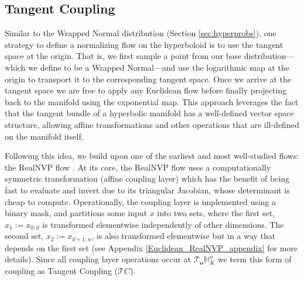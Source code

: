\subsection{Tangent Coupling}
Similar to the Wrapped Normal distribution (Section \ref{sec:hyperprobs}), one strategy to define a normalizing flow on the hyperboloid is to use the tangent space at the origin. That is, we first sample a point from our base distribution---which we define to be a Wrapped Normal---and use the logarithmic map at the origin to transport it to the corresponding tangent space. Once we arrive at the tangent space we are free to apply any Euclidean flow before finally projecting back to the manifold using the exponential map. 
This approach leverages the fact that the tangent bundle of a hyperbolic manifold has a well-defined vector space structure, allowing affine transformations and other operations that are ill-defined on the manifold itself. 

Following this idea, we build upon one of the earliest and most well-studied flows: the RealNVP flow \cite{dinh2016density}. At its core, the RealNVP flow uses a computationally symmetric transformation (affine coupling layer) which has the benefit of being fast to evaluate and invert due to its triangular Jacobian, whose determinant is cheap to compute. Operationally, the coupling layer is implemented using a binary mask, and partitions some input $x$ into two sets, where the first set, $x_1:=x_{0:d}$ is transformed elementwise independently of other dimensions. The second set, $x_2:=x_{d+1:n}$, is also transformed elementwise but in a way that depends on the first set (see Appendix \ref{Euclidean_RealNVP_appendix} for more details). Since all coupling layer operations occur at $\mathcal{T}_{\textbf{o}}\mathbb{H}^n_K$ we term this form of coupling as Tangent Coupling ($\mathcal{T}C$). 

